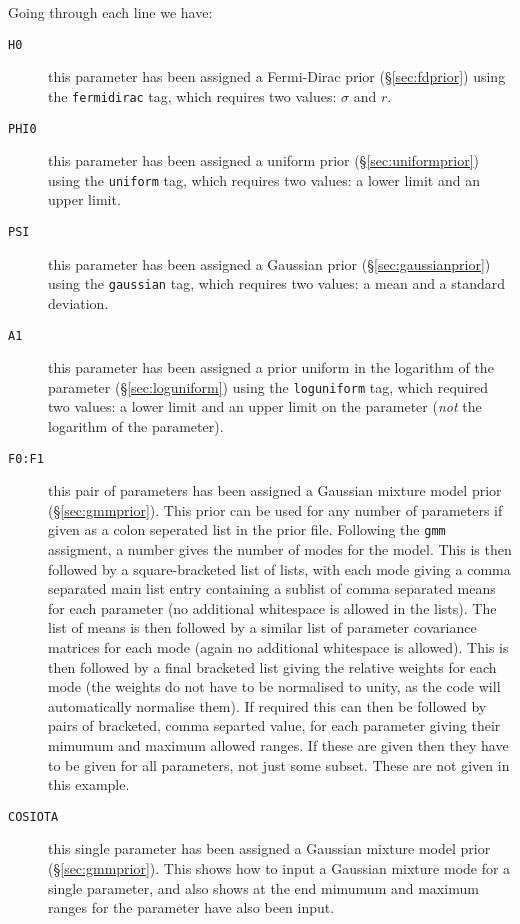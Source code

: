 Going through each line we have:
\begin{description}
 \item[{\tt{H0}}] this parameter has been assigned a Fermi-Dirac prior (\S\ref{sec:fdprior}) using the {\tt fermidirac} tag, which requires two values: $\sigma$ and $r$.
 \item[{\tt{PHI0}}] this parameter has been assigned a uniform prior (\S\ref{sec:uniformprior}) using the {\tt uniform} tag, which requires two values: a lower limit and an upper limit.
 \item[{\tt{PSI}}] this parameter has been assigned a Gaussian prior (\S\ref{sec:gaussianprior}) using the {\tt gaussian} tag, which requires two values: a mean and a standard deviation.
 \item[{\tt{A1}}] this parameter has been assigned a prior uniform in the logarithm of the parameter (\S\ref{sec:loguniform}) using the {\tt loguniform} tag, which
 required two values: a lower limit and an upper limit on the parameter ({\it not} the logarithm of the parameter).
 \item[{\tt{F0:F1}}] this pair of parameters has been assigned a Gaussian mixture model prior (\S\ref{sec:gmmprior}). This prior can be used for any number of
 parameters if given as a colon seperated list in the prior file. Following the {\tt gmm} assigment, a number gives the number of modes for the model. This is then
 followed by a square-bracketed list of lists, with each mode giving a comma separated main list entry containing a sublist of comma separated means for each parameter 
 (no additional whitespace is allowed in the lists). The list of means is then followed by a similar list of parameter covariance matrices for each mode (again no
 additional whitespace is allowed). This is then followed by a final bracketed list giving the relative weights for each mode (the weights do not have to be
 normalised to unity, as the code will automatically normalise them). If required this can then be followed by pairs of bracketed, comma separted value, for each
 parameter giving their mimumum and maximum allowed ranges. If these are given then they have to be given for all parameters, not just some subset. These are not
 given in this example.
 \item[{\tt{COSIOTA}}] this single parameter has been assigned a Gaussian mixture model prior (\S\ref{sec:gmmprior}). This shows how to input a Gaussian mixture
 mode for a single parameter, and also shows at the end mimumum and maximum ranges for the parameter have also been input.
\end{description}

